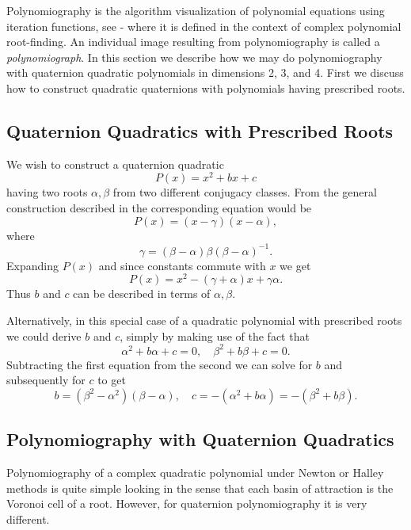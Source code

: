 \documentclass{article}
\theoremstyle{definition}
\begin{document}
Polynomiography is the algorithm visualization of polynomial
equations using iteration functions, see \cite{kalbook}-\cite{kal2005c} where it is defined in the context of complex
polynomial root-finding. An individual image resulting from
polynomiography is called a {\it polynomiograph}. In this section we
describe how we may do polynomiography with quaternion quadratic
polynomials in dimensions 2, 3, and 4. First we discuss how to
construct quadratic quaternions with polynomials having prescribed roots.

\subsection{Quaternion Quadratics with Prescribed Roots}

We wish to construct a quaternion quadratic
\begin{equation} \label{qq0}
P(x)=x^2+bx+c
\end{equation}
having two roots $\alpha, \beta$ from two different conjugacy
classes. From the general construction described in \cite{kalQ}  the corresponding equation would be
\begin{equation} \label{qq1}
P(x)=(x-\gamma)(x- \alpha),
\end{equation}
where
\begin{equation} \label{qq2}
\gamma=(\beta-\alpha)\beta(\beta-\alpha)^{-1}.
\end{equation}
Expanding $P(x)$ and since constants commute with $x$ we get
\begin{equation}
P(x)=x^2 - (\gamma + \alpha)x+ \gamma \alpha.
\end{equation}
Thus $b$ and $c$ can be described in terms of $\alpha, \beta$.

Alternatively, in this special case of a quadratic polynomial with prescribed roots we could derive $b$ and $c$, simply by making use of the fact that
\begin{equation}
\alpha^2+b \alpha +c =0, \quad \beta^2+b \beta +c =0.
\end{equation}
Subtracting the first equation from the second we can solve for $b$ and subsequently for $c$ to get
\begin{equation}
b=(\beta^2-\alpha^2)(\beta-\alpha), \quad c= -(\alpha^2 + b \alpha) =-(\beta^2 + b \beta).
\end{equation}

\subsection{Polynomiography with Quaternion Quadratics}
Polynomiography of a complex quadratic polynomial under Newton or Halley methods
is quite simple looking in the sense that each basin of attraction is the Voronoi cell of a root. However, for quaternion polynomiography it is very different.
\end{document}
